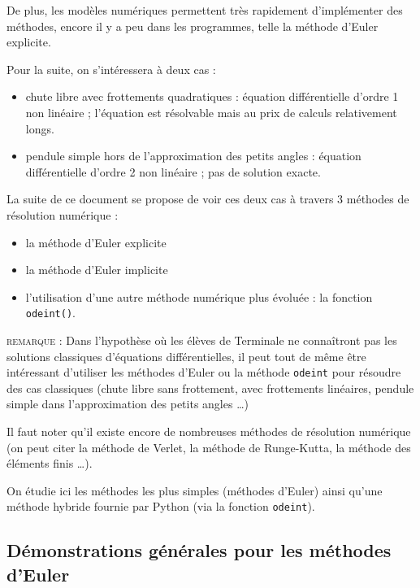 \documentclass[11pt]{article}
\begin{document}
\smallskip
De plus, les modèles numériques permettent très rapidement d'implémenter des méthodes, encore il y a peu dans les programmes, telle la méthode d'Euler explicite.

\smallskip
Pour la suite, on s'intéressera à deux cas : 

\begin{itemize}
 \item chute libre avec frottements quadratiques : équation différentielle d'ordre 1 non linéaire ; l'équation est résolvable mais au prix de calculs relativement longs.
 \item pendule simple hors de l'approximation des petits angles : équation différentielle d'ordre 2 non linéaire ; pas de solution exacte. 
\end{itemize}




\smallskip
La suite de ce document se propose de voir ces deux cas à travers 3 méthodes de résolution numérique :  
\begin{itemize}
 \item la méthode d'Euler explicite
 \item la méthode d'Euler implicite
 \item l'utilisation d'une autre méthode numérique plus évoluée : la fonction \texttt{odeint()}.
\end{itemize}


\medskip

\textsc{remarque : } Dans l'hypothèse où les élèves de Terminale ne connaîtront pas les solutions classiques d'équations différentielles, il peut tout de même être intéressant d'utiliser les méthodes d'Euler ou la méthode \texttt{odeint} pour résoudre des cas classiques (chute libre sans frottement, avec frottements linéaires, pendule simple dans l'approximation des petits angles \ldots )



\medskip


Il faut noter qu'il existe encore de nombreuses méthodes de résolution numérique (on peut citer la méthode de Verlet, la méthode de Runge-Kutta, la méthode des éléments finis \ldots ).


\medskip
On étudie ici les méthodes les plus simples (méthodes d'Euler) ainsi qu'une méthode hybride fournie par Python (via la fonction \texttt{odeint}).






\subsection{Démonstrations générales pour les méthodes d'Euler}
\end{document}
